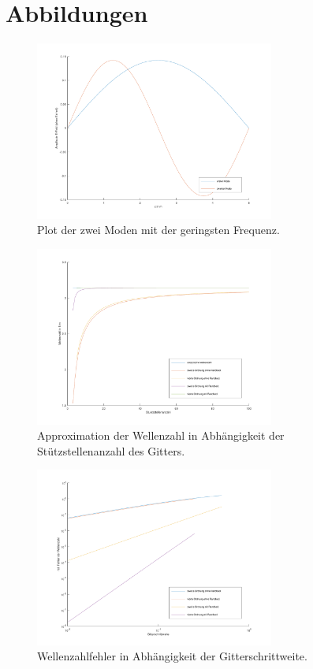 \documentclass[Protokollheft.tex]{subfiles}
\begin{document}
	\section{Abbildungen}
	\begin{figure}[h]
		\centering
		\includegraphics[trim = 20mm 15mm 20mm 15mm, clip, width=0.7\textwidth]{modes.pdf}
		\caption{Plot der zwei Moden mit der geringsten Frequenz.}
		\label{fig:modes}
	\end{figure}
	\begin{figure}[h]
		\centering
		\includegraphics[trim = 25mm 10mm 25mm 15mm, clip, width=0.7\textwidth]{plotConv.pdf}
		\caption{Approximation der Wellenzahl in Abhängigkeit der Stützstellenanzahl des Gitters.}
		\label{Abb:plotCov}
	\end{figure}
	\begin{figure}[h]
		\centering
		\includegraphics[trim = 25mm 10mm 25mm 15mm, clip, width=0.7\textwidth]{plotConvloglog.pdf}
		\caption{Wellenzahlfehler in Abhängigkeit der Gitterschrittweite.}
		\label{Abb:plotCovloglog}
	\end{figure}
\end{document}
